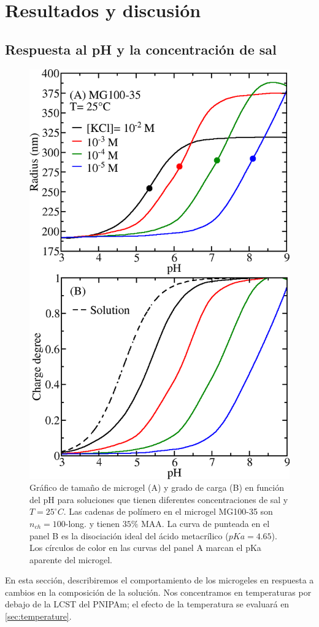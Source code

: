 \section{Resultados y discusi\'on}



\subsection{Respuesta al pH y la concentraci\'on de sal}\label{sec:pH_salt}


\begin{figure}[!ht]
\centering
\includegraphics[width=0.5\linewidth]{Figures/graph-gel/R-pH.png}
\caption{Gr\'afico de tama\~no de microgel (A) y grado de carga (B) en funci\'on del pH para soluciones que tienen diferentes concentraciones de sal y $T=25 ^\circ C$.
	Las cadenas de pol\'imero en el microgel MG100-35 son $n_{ch}=100$-long. y tienen $35\% $ MAA.
	La curva de  punteada en el panel B es la disociaci\'on ideal del \'acido metacr\'ilico ($pKa=4.65$).
	Los c\'irculos de color en las curvas del panel A marcan el pKa aparente del microgel.}
\label{fig:R-pH}
\end{figure}

En esta secci\'on, describiremos el comportamiento de los microgeles en respuesta a cambios en la composici\'on de la soluci\'on.
Nos concentramos en temperaturas por debajo de la LCST del PNIPAm;
el efecto de la temperatura se evaluar\'a en \ref{sec:temperature}.


